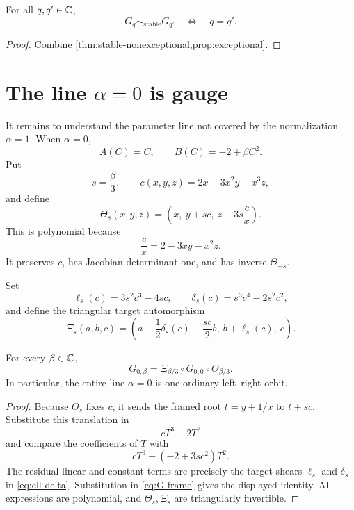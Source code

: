 \documentclass[11pt,reqno]{amsart}
\begin{document}
\begin{corollary}
\label{cor:q-classification}
For all \(q,q'\in\mathbb C\),
\[
G_q\sim_{\mathrm{stable}}G_{q'}
\quad\Longleftrightarrow\quad
q=q'.
\]
\end{corollary}

\begin{proof}
Combine \cref{thm:stable-nonexceptional,prop:exceptional}.
\end{proof}

\section{The line \texorpdfstring{\(\alpha=0\)}{alpha=0} is gauge}
\label{sec:alpha-zero}

It remains to understand the parameter line not covered by the normalization
\(\alpha=1\).  When \(\alpha=0\),
\[
A(C)=C,\qquad B(C)=-2+\beta C^2.
\]
Put
\[
s=\frac\beta3,\qquad
c(x,y,z)=2x-3x^2y-x^3z,
\]
and define
\begin{equation}
\label{eq:Theta}
\Theta_s(x,y,z)=
\left(
x,\ y+sc,\ z-3s\frac cx
\right).
\end{equation}
This is polynomial because
\[
\frac cx=2-3xy-x^2z.
\]
It preserves \(c\), has Jacobian determinant one, and has inverse
\(\Theta_{-s}\).

Set
\begin{equation}
\label{eq:ell-delta}
\ell_s(c)=3s^2c^3-4sc,\qquad
\delta_s(c)=s^3c^4-2s^2c^2,
\end{equation}
and define the triangular target automorphism
\begin{equation}
\label{eq:Xi}
\Xi_s(a,b,c)=
\left(
a-\frac12\delta_s(c)-\frac{sc}{2}b,\
b+\ell_s(c),\
c
\right).
\end{equation}

\begin{proposition}
\label{prop:alpha-zero-gauge}
For every \(\beta\in\mathbb C\),
\[
G_{0,\beta}
=
\Xi_{\beta/3}\circ G_{0,0}\circ\Theta_{\beta/3}.
\]
In particular, the entire line \(\alpha=0\) is one ordinary left--right
orbit.
\end{proposition}

\begin{proof}
Because \(\Theta_s\) fixes \(c\), it sends the framed root
\(t=y+1/x\) to \(t+sc\).  Substitute this translation in
\[
cT^3-2T^2
\]
and compare the coefficients of \(T\) with
\[
cT^3+(-2+3sc^2)T^2.
\]
The residual linear and constant terms are precisely the target shears
\(\ell_s\) and \(\delta_s\) in \eqref{eq:ell-delta}.  Substitution in
\eqref{eq:G-frame} gives the displayed identity.  All expressions are
polynomial, and \(\Theta_s,\Xi_s\) are triangularly invertible.
\end{proof}
\end{document}
